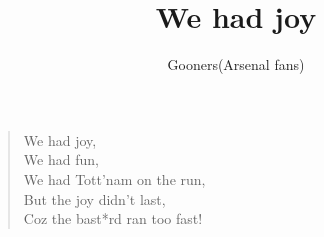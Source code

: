\documentclass[a4paper,12pt]{article}
\title{We had joy}
\author{Gooners(Arsenal fans)}
\date{}
\begin{document}
	
	\maketitle
	
	\begin{verse}
		
		We had joy, \\
		We had fun, \\
		We had Tott'nam on the run, \\
		But the joy didn't last, \\
		Coz the bast*rd ran too fast!
		
	\end{verse}
	
\end{document}
